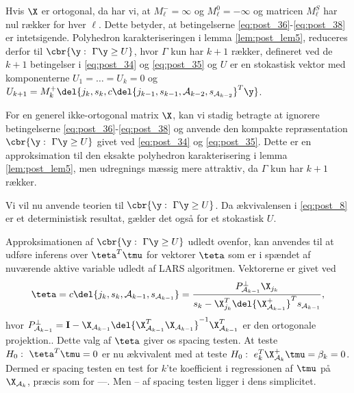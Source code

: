 Hvis \(\X\) er ortogonal, da har vi, at \(M_\ell^-= \infty\) og \(M_\ell^0=-\infty\) og matricen \(M_\ell^S\) har nul rækker for hver \(\ell\).
Dette betyder, at betingelserne \eqref{eq:post_36}-\eqref{eq:post_38} er intetsigende.
Polyhedron karakteriseringen i lemma \ref{lem:post_lem5}, reduceres derfor til \(\cbr{\y: \ \Gamma \y \geq U}\), hvor \(\Gamma\) kun har \(k+1\) rækker, defineret ved de \(k+1\) betingelser i \eqref{eq:post_34} og \eqref{eq:post_35} og \(U\) er en stokastisk vektor med komponenterne \(U_1 = \dots = U_k=0\) og \(U_{k+1}= M_k^+ \del{j_k,s_k, c \del{j_{k-1}, s_{k-1}, \mathcal{A}_{k-2}, s_{\mathcal{A}_{k-2}}}^T \y}\).

For en generel ikke-ortogonal matrix \(\X\), kan vi stadig betragte at ignorere betingelserne \eqref{eq:post_36}-\eqref{eq:post_38} og anvende den kompakte repræsentation \(\cbr{\y: \ \Gamma \y \geq U}\) givet ved \eqref{eq:post_34} og \eqref{eq:post_35}.
Dette er en approksimation til den eksakte polyhedron karakterisering i lemma \ref{lem:post_lem5}, men udregnings mæssig mere attraktiv, da \(\Gamma\) kun har \(k+1\) rækker.

Vi vil nu anvende teorien til \(\cbr{\y: \ \Gamma \y \geq U}\).
Da ækvivalensen  i \eqref{eq:post_8} er et deterministisk resultat, gælder det også for et stokastisk \(U\).

Approksimationen af \(\cbr{\y : \ \Gamma \y \geq U}\) udledt ovenfor, kan anvendes til at udføre inferens over \(\teta^T \tmu\) for vektorer \(\teta\) som er i spændet af nuværende aktive variable udledt af LARS algoritmen.
Vektorerne er givet ved
\begin{align}
\teta = c \del{j_k, s_k, \mathcal{A}_{k-1}, s_{\mathcal{A}_{k-1}}} = \frac{P_{\mathcal{A}_{k-1}}^\perp \X_{j_{k}}}{s_k - \X_{j_{k}}^T \del{\X_{\mathcal{A}_{k-1}}^+}^T s_{\mathcal{A}_{k-1}}}, \label{eq:post_40}
\end{align}
hvor \(P_{\mathcal{A}_{k-1}}^\perp = \mathbf{I} - \X_{\mathcal{A}_{k-1}} \del{\X_{\mathcal{A}_{k-1}}^T \X_{\mathcal{A}_{k-1}}}^{-1} \X_{\mathcal{A}_{k-1}}^T\) er den ortogonale projektion..
Dette valg af \(\teta\) giver os spacing testen.
At teste \(H_0: \ \teta^T \tmu = 0\) er nu ækvivalent med at teste \(H_0: \ e_k^T \X_{\mathcal{A}_k}^+ \tmu = \beta_k = 0\).
Dermed er spacing testen en test for \(k\)'te koefficient i regressionen af \(\tmu\) på \(\X_{\mathcal{A}_k}\), præcis som for ---.
Men -- af spacing testen ligger i dens simplicitet.

